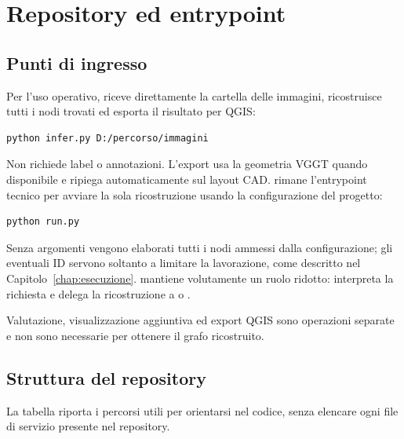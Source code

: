 \chapter{Repository ed entrypoint}
\label{chap:repository}

\section{Punti di ingresso}

Per l'uso operativo,  riceve direttamente la cartella delle
immagini, ricostruisce tutti i nodi trovati ed esporta il risultato per QGIS:

\begin{lstlisting}[language={}]
python infer.py D:/percorso/immagini
\end{lstlisting}

Non richiede label o annotazioni. L'export usa la geometria VGGT quando
disponibile e ripiega automaticamente sul layout CAD.  rimane
l'entrypoint tecnico
per avviare la sola ricostruzione usando la configurazione del progetto:

\begin{lstlisting}[language={}]
python run.py
\end{lstlisting}

Senza argomenti vengono elaborati tutti i nodi ammessi dalla configurazione;
gli eventuali ID servono soltanto a limitare la lavorazione, come descritto nel
Capitolo~\ref{chap:esecuzione}.  mantiene volutamente un ruolo
ridotto: interpreta la richiesta e delega la ricostruzione a
 o .

Valutazione, visualizzazione aggiuntiva ed export QGIS sono operazioni separate
e non sono necessarie per ottenere il grafo ricostruito.

\section{Struttura del repository}

La tabella riporta i percorsi utili per orientarsi nel codice, senza elencare
ogni file di servizio presente nel repository.

